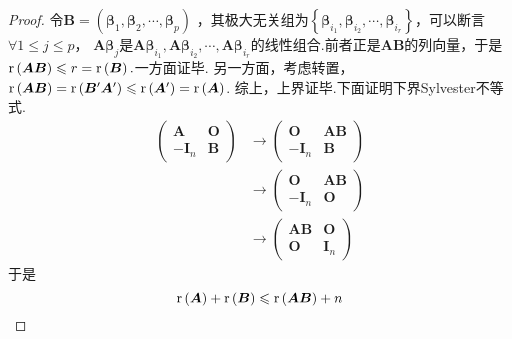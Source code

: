 {\begin{proof}
        令$\bm{B}=\left(
            \bm{\beta}_1,\bm{\beta}_2,\cdots,\bm{\beta}_p
            \right)$
        ，其极大无关组为$\left\{
            \bm{\beta}_{i_1},\bm{\beta}_{i_2},\cdots,\bm{\beta}_{i_r}
            \right\}$，可以断言$\forall 1\leqslant j\leqslant p$，
        $\bm{A\beta}_j$是$
            \bm{A\beta}_{i_1},\bm{A\beta}_{i_2},
            \cdots,\bm{A\beta}_{i_r}
        $的线性组合.前者正是$\bm{AB}$的列向量，于是
        $\mathrm{r} \left(\bm{AB}\right)\leqslant r=\mathrm{r}
            \left(\bm{B}\right).$一方面证毕.
        另一方面，考虑转置，$\mathrm{r} \left(\bm{AB}\right)=
            \mathrm{r} \left(\bm{B}^{\prime}\bm{A}^{\prime}\right)\leqslant
            \mathrm{r} \left(\bm{A}^{\prime}\right)=\mathrm{r} \left(\bm{A}
            \right)$.
        综上，上界证毕.下面证明下界Sylvester不等式.
        \begin{align*}
            \begin{pmatrix}
                \bm{A}    & \bm{O} \\
                -\bm{I}_n & \bm{B}
            \end{pmatrix}
             & \longrightarrow
            \begin{pmatrix}
                \bm{O}    & \bm{AB} \\
                -\bm{I}_n & \bm{B}
            \end{pmatrix} \\
             & \longrightarrow
            \begin{pmatrix}
                \bm{O}    & \bm{AB} \\
                -\bm{I}_n & \bm{O}
            \end{pmatrix} \\
             & \longrightarrow
            \begin{pmatrix}
                \bm{AB} & \bm{O}   \\
                \bm{O}  & \bm{I}_n
            \end{pmatrix}
        \end{align*}
        于是
        \[
            \mathrm{r} \left(\bm{A}\right)+\mathrm{r} \left(\bm{B}\right)\leqslant
            \mathrm{r} \left(\bm{AB}\right)+n\qedhere
        \]
    \end{proof}
}
